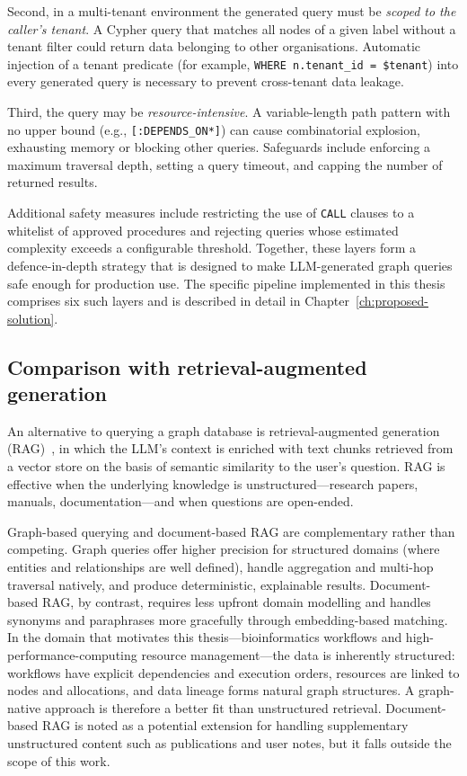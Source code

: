 \documentclass[a4paper]{sapthesis}
\begin{document}
Second, in a multi-tenant environment the generated query must be
\emph{scoped to the caller's tenant}.  A Cypher query that matches all
nodes of a given label without a tenant filter could return data belonging
to other organisations.  Automatic injection of a tenant predicate (for
example, \texttt{WHERE n.tenant\_id = \$tenant}) into every generated query
is necessary to prevent cross-tenant data leakage.

Third, the query may be \emph{resource-intensive}.  A variable-length path
pattern with no upper bound (e.g., \texttt{[:DEPENDS\_ON*]}) can cause
combinatorial explosion, exhausting memory or blocking other queries.
Safeguards include enforcing a maximum traversal depth, setting a query
timeout, and capping the number of returned results.

Additional safety measures include restricting the use of \texttt{CALL}
clauses to a whitelist of approved procedures and rejecting queries whose
estimated complexity exceeds a configurable threshold.  Together,
these layers form a defence-in-depth strategy that is designed to make
LLM-generated graph queries safe enough for production use.  The specific
pipeline implemented in this thesis comprises six such layers and is
described in detail in Chapter~\ref{ch:proposed-solution}.

\subsection{Comparison with retrieval-augmented generation}

An alternative to querying a graph database is retrieval-augmented
generation (RAG)~\cite{lewis2020rag}, in which the LLM's context is
enriched with text chunks retrieved from a vector store on the basis of
semantic similarity to the user's question.  RAG is effective when the
underlying knowledge is unstructured---research papers, manuals,
documentation---and when questions are open-ended.

Graph-based querying and document-based RAG are complementary rather than
competing.  Graph queries offer higher precision for structured domains
(where entities and relationships are well defined), handle aggregation and
multi-hop traversal natively, and produce deterministic, explainable
results.  Document-based RAG, by contrast, requires less upfront domain
modelling and handles synonyms and paraphrases more gracefully through
embedding-based matching.  In the domain that motivates this
thesis---bioinformatics workflows and high-performance-computing resource
management---the data is inherently structured: workflows have explicit
dependencies and execution orders, resources are linked to nodes and
allocations, and data lineage forms natural graph structures.  A
graph-native approach is therefore a better fit than unstructured retrieval.
Document-based RAG is noted as a potential extension for handling
supplementary unstructured content such as publications and user notes, but
it falls outside the scope of this work.
\end{document}
